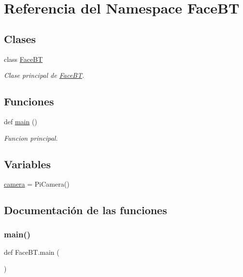 \hypertarget{namespace_face_b_t}{}\section{Referencia del Namespace Face\+BT}
\label{namespace_face_b_t}
\subsection*{Clases}
\begin{DoxyCompactItemize}
\item 
class \mbox{\hyperlink{class_face_b_t_1_1_face_b_t}{Face\+BT}}
\begin{DoxyCompactList}\small\item\em Clase principal de \mbox{\hyperlink{class_face_b_t_1_1_face_b_t}{Face\+BT}}. \end{DoxyCompactList}\end{DoxyCompactItemize}
\subsection*{Funciones}
\begin{DoxyCompactItemize}
\item 
def \mbox{\hyperlink{namespace_face_b_t_ae0478ade43b4da93ebb363e389220087}{main}} ()
\begin{DoxyCompactList}\small\item\em Funcion principal. \end{DoxyCompactList}\end{DoxyCompactItemize}
\subsection*{Variables}
\begin{DoxyCompactItemize}
\item 
\mbox{\hyperlink{namespace_face_b_t_a96f57377873e3c5cae0ad546f0a65bb7}{camera}} = Pi\+Camera()
\end{DoxyCompactItemize}


\subsection{Documentación de las funciones}
\mbox{\label{namespace_face_b_t_ae0478ade43b4da93ebb363e389220087}} 
\subsubsection{\texorpdfstring{main()}{main()}}
{\footnotesize\ttfamily def Face\+B\+T.\+main (\begin{DoxyParamCaption}{ }\end{DoxyParamCaption})}




